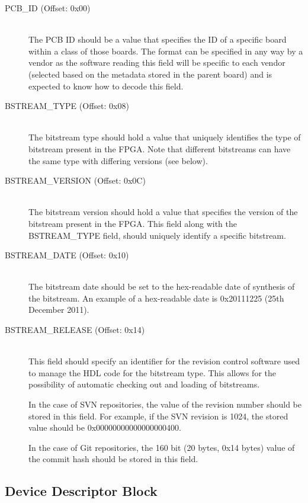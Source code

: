 \documentclass{article}
\begin{document}
\begin{description}
\item[PCB\_ID (Offset: 0x00)] \hfill \\
The PCB ID should be a value that specifies the ID of a specific board within
a class of those boards. The format can be specified in any way by a vendor
as the software reading this field will be specific to each vendor (selected
based on the metadata stored in the parent board) and is expected to know how to decode
this field.

\item[BSTREAM\_TYPE (Offset: 0x08)] \hfill \\
The bitstream type should hold a value that uniquely identifies the type of 
bitstream present in the FPGA. Note that different bitstreams can have the
same type with differing versions (see below).

\item[BSTREAM\_VERSION (Offset: 0x0C)] \hfill \\
The bitstream version should hold a value that specifies the version of the
bitstream present in the FPGA. This field along with the BSTREAM\_TYPE field,
should uniquely identify a specific bitstream.

\item[BSTREAM\_DATE (Offset: 0x10)] \hfill \\
The bitstream date should be set to the hex-readable date of synthesis of
the bitstream. An example of a hex-readable date is 0x20111225 (25th December
2011).

\item[BSTREAM\_RELEASE (Offset: 0x14)] \hfill \\
This field should specify an identifier for the revision control software
used to manage the HDL code for the bitstream type. This allows for the 
possibility of automatic checking out and loading of bitstreams.

In the case of SVN repositories, the value of the revision number should
be stored in this field. For example, if the SVN revision is 1024, the 
stored value should be 0x00000000000000000400.

In the case of Git repositories, the 160 bit (20 bytes, 0x14 bytes) value
of the commit hash should be stored in this field.

\end{description}

\subsection{Device Descriptor Block}\label{device_block}
\end{document}
